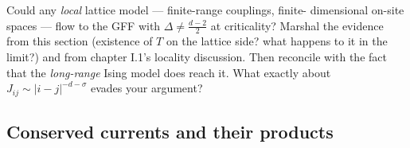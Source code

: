\begin{exercise}[thinker]
\label{exr:gff-lattice}
Could any \emph{local} lattice model --- finite-range couplings, finite-
dimensional on-site spaces --- flow to the GFF with $\Delta \ne
\frac{d-2}{2}$ at criticality? Marshal the evidence from this section
(existence of $T$ on the lattice side? what happens to it in the limit?) and
from chapter I.1's locality discussion. Then reconcile with the fact that the
\emph{long-range} Ising model does reach it. What exactly about
$J_{ij} \sim |i-j|^{-d-\sigma}$ evades your argument?
\end{exercise}

\subsection{Conserved currents and their products}
\label{sec:currents}

